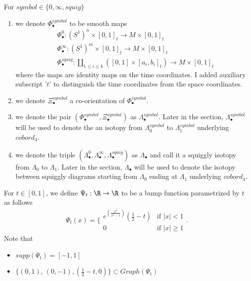 \begin{definition}
For $symbol\in\{0,\infty, squig \}$
\begin{enumerate}
\item we denote $\Phi_\bullet^{symbol}$ to be smooth maps
\begin{align*}
&\Phi_\bullet^0 : (S^1)^n \times [0,1]_t \rightarrow M \times [0,1]_t \\
&\Phi_\bullet^\infty : (S^1)^m \times [0,1]_t \rightarrow M \times [0,1]_t \\
&\Phi_\bullet^{squig} : \coprod_{1\leq i \leq k} ([0,1] \times [a_i,b_i]_t) \rightarrow M \times [0,1]_t
\end{align*}
where the maps are identity maps on the time coordinates. I added auxiliary subscript '$t$' to distinguish the time coordinates from the space coordinates.

\item we denote $\Xi_\bullet^{symbol}$ a co-orientation of $\Phi_\bullet^{symbol}$.

\item we denote the pair $(\Phi_\bullet^{symbol},\Xi_\bullet^{symbol})$ as $\Lambda_\bullet^{symbol}$. Later in the section, $\Lambda_\bullet^{symbol}$ will be used to denote the an isotopy from $\Lambda_0^{symbol}$ to $\Lambda_1^{symbol}$ underlying $cobord_4$.

\item we denote the triple $(\Lambda_\bullet^{0},\Lambda_\bullet^{\infty},\Lambda_\bullet^{squig})$ as $\Lambda_\bullet$ and call it a squiggly isotopy from $\Lambda_0$ to $\Lambda_1$. Later in the section, $\Lambda_\bullet$ will be used to denote the isotopy between squiggly diagrams starting from $\Lambda_0$ ending at $\Lambda_1$ underlying $cobord_4$.
\end{enumerate}
\end{definition}

\begin{definition}
For $t \in [0,1]$, we define $\Psi_t: \R \rightarrow \R$ to be a bump function parametrized by $t$ as follows
\[\Psi_t(x)=\bigg\{
\begin{array}{ll}
    e^{(\frac{x^2}{x^2 - 1})}(\frac{1}{2}-t) & \text{if } |x| < 1 \\
    0 & \text{if } |x| \geq 1
\end{array}
\bigg.
\]
Note that 
\begin{itemize}
\item $supp(\Psi_t) = [-1,1]$

\item $\{(0,1)$, $(0,-1),(\frac{1}{2}-t , 0)\} \subset Graph(\Psi_t)$
\end{itemize}
\end{definition}

